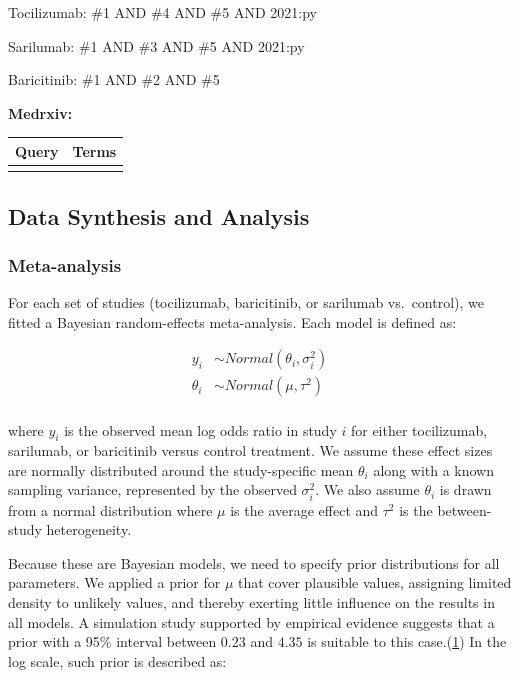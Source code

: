 \documentclass[
  12pt,
]{article}
\begin{document}
Tocilizumab: \#1 AND \#4 AND \#5 AND 2021:py

Sarilumab: \#1 AND \#3 AND \#5 AND 2021:py

Baricitinib: \#1 AND \#2 AND \#5

\newpage

\textbf{Medrxiv:}

\begin{tabu} to 
\hline
Query & Terms\\
\hline
{} & \\
\hline
\end{tabu}

\newpage

\hypertarget{data-synthesis-and-analysis}{%
\subsection{Data Synthesis and
Analysis}\label{data-synthesis-and-analysis}}

\hypertarget{meta-analysis}{%
\subsubsection{Meta-analysis}\label{meta-analysis}}

For each set of studies (tocilizumab, baricitinib, or sarilumab
vs.~control), we fitted a Bayesian random-effects meta-analysis. Each
model is defined as:

\begin{align*}
y_i & \sim Normal(\theta_i, \sigma_i^2)\\
\theta_i & \sim Normal(\mu, \tau^2)\\
\end{align*}

where \(y_i\) is the observed mean log odds ratio in study \(i\) for
either tocilizumab, sarilumab, or baricitinib versus control treatment.
We assume these effect sizes are normally distributed around the
study-specific mean \(\theta_i\) along with a known sampling variance,
represented by the observed \(\sigma_i^2\). We also assume \(\theta_i\)
is drawn from a normal distribution where \(\mu\) is the average effect
and \(\tau^2\) is the between-study heterogeneity.

Because these are Bayesian models, we need to specify prior
distributions for all parameters. We applied a prior for \(\mu\) that
cover plausible values, assigning limited density to unlikely values,
and thereby exerting little influence on the results in all models. A
simulation study supported by empirical evidence suggests that a prior
with a 95\% interval between \(0.23\) and \(4.35\) is suitable to this
case.(\protect\hyperlink{ref-pedroza2018}{1}) In the log scale, such
prior is described as:
\end{document}
